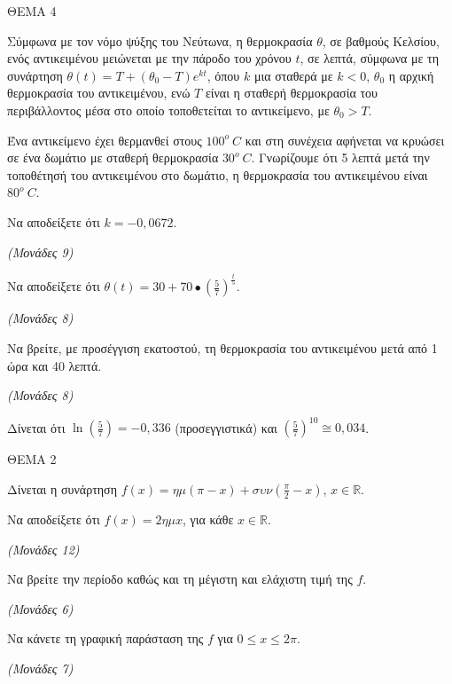 \documentclass[11pt,a4paper,twoside]{book}
\newcommand{\monades}[1]{\hfill \textit{(Μονάδες #1)}}
\begin{document}
ΘΕΜΑ 4

Σύμφωνα με τον νόμο ψύξης του Νεύτωνα, η θερμοκρασία $\theta$, σε βαθμούς Κελσίου, ενός αντικειμένου μειώνεται με την πάροδο του χρόνου $t$, σε λεπτά, σύμφωνα με τη συνάρτηση $\theta(t) = T + (\theta_{0} - Τ)e^{kt}$, όπου $k$ μια σταθερά με $k < 0$, $\theta_{0}$ η αρχική θερμοκρασία του αντικειμένου, ενώ $Τ$ είναι η σταθερή θερμοκρασία του περιβάλλοντος μέσα στο οποίο τοποθετείται το αντικείμενο, με $\theta_{0} > Τ$.

Ένα αντικείμενο έχει θερμανθεί στους $100^{ο}\ C$ και στη συνέχεια αφήνεται να κρυώσει σε ένα δωμάτιο με σταθερή θερμοκρασία $30^{ο}\ C$. Γνωρίζουμε ότι 5 λεπτά μετά την τοποθέτησή του αντικειμένου στο δωμάτιο, η θερμοκρασία του αντικειμένου είναι $80^{ο}\ C$.

\begin{alist}
\item Να αποδείξετε ότι $k = - 0,0672$.

\monades{9}

\item Να αποδείξετε ότι $\theta(t) = 30 + 70 \bullet \left( \frac{5}{7} \right)^{\frac{t}{5}}$.

\monades{8}

\item Να βρείτε, με προσέγγιση εκατοστού, τη θερμοκρασία του αντικειμένου μετά από 1 ώρα και 40 λεπτά.

\monades{8}

Δίνεται ότι $\ln\left( \frac{5}{7} \right) = - 0,336$ (προσεγγιστικά) και $\left( \frac{5}{7} \right)^{10} \cong 0,034$.
\end{alist}

\vspace{4mm}

ΘEMA 2

Δίνεται η συνάρτηση $f(x) = \eta\mu(\pi - x) + \sigma\upsilon\nu\left(\frac{\pi}{2} - x\right)$, $x \in \mathbb{R}$.

\begin{alist}
\item Να αποδείξετε ότι $f(x) = 2\eta\mu x$, για κάθε $x \in \mathbb{R}$.

\monades{12}

\item

\begin{rlist}
\item Να βρείτε την περίοδο καθώς και τη μέγιστη και ελάχιστη τιμή της $f$.

\monades{6}

\item Να κάνετε τη γραφική παράσταση της $f$ για $0 \le x \le 2\pi$.

\monades{7}
\end{rlist}
\end{alist}
\end{document}
